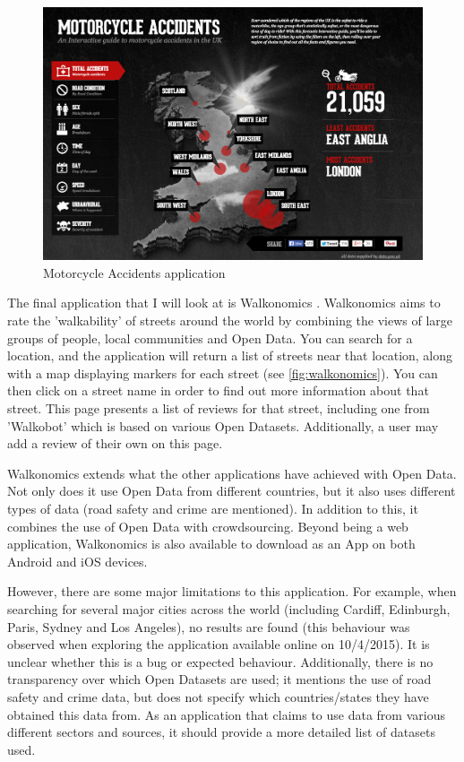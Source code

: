 \documentclass[authoryearcitations]{UoYCSproject}
\begin{document}
\begin{figure}
	\includegraphics[scale=0.3]{motorcycle}
	\caption{Motorcycle Accidents application}
	\label{fig:motorcycle}
\end{figure}

The final application that I will look at is Walkonomics \citep{Davies}. Walkonomics aims to rate the 'walkability' of streets around the world by combining the views of large groups of people, local communities and Open Data. You can search for a location, and the application will return a list of streets near that location, along with a map displaying markers for each street (see \autoref{fig:walkonomics}). You can then click on a street name in order to find out more information about that street. This page presents a list of reviews for that street, including one from 'Walkobot' which is based on various Open Datasets. Additionally, a user may add a review of their own on this page. 

Walkonomics extends what the other applications have achieved with Open Data. Not only does it use Open Data from different countries, but it also uses different types of data (road safety and crime are mentioned). In addition to this, it combines the use of Open Data with crowdsourcing. Beyond being a web application, Walkonomics is also available to download as an App on both Android and iOS devices.

However, there are some major limitations to this application. For example, when searching for several major cities across the world (including Cardiff, Edinburgh, Paris, Sydney and Los Angeles), no results are found (this behaviour was observed when exploring the application available online on 10/4/2015). It is unclear whether this is a bug or expected behaviour. Additionally, there is no transparency over which Open Datasets are used; it mentions the use of road safety and crime data, but does not specify which countries/states they have obtained this data from. As an application that claims to use data from various different sectors and sources, it should provide a more detailed list of datasets used.
\end{document}
